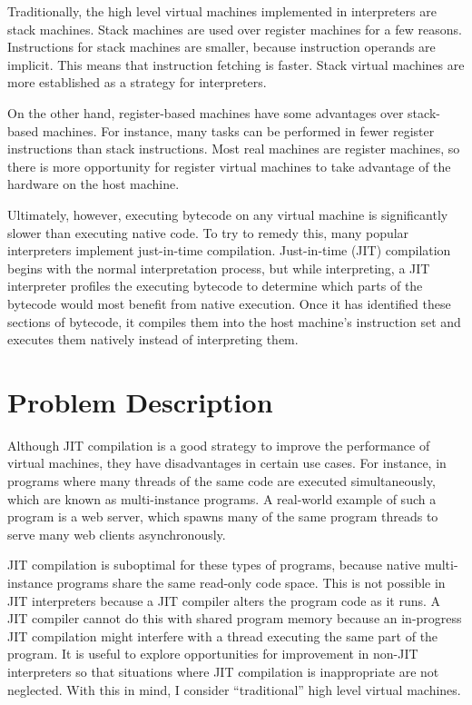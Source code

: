 		Traditionally, the high level virtual machines implemented in interpreters are stack machines. Stack machines are used over register machines for a few reasons. Instructions for stack machines are smaller, because instruction operands are implicit.  This means that instruction fetching is faster. Stack virtual machines are more established as a strategy for interpreters.
	
		On the other hand, register-based machines have some advantages over stack-based machines. For instance, many tasks can be performed in fewer register instructions than stack instructions. \citep{caseregistervm} Most real machines are register machines, so there is more opportunity for register virtual machines to take advantage of the hardware on the host machine. 
		
		Ultimately, however, executing bytecode on any virtual machine is significantly slower than executing native code.\citep{optimizingindirectbranch} To try to remedy this, many popular interpreters implement just-in-time compilation. Just-in-time (JIT) compilation begins with the normal interpretation process, but while interpreting, a JIT interpreter profiles the executing bytecode to determine which parts of the bytecode would most benefit from native execution. Once it has identified these sections of bytecode, it compiles them into the host machine's instruction set and executes them natively instead of interpreting them. 
		
	\section{Problem Description}
		Although JIT compilation is a good strategy to improve the performance of virtual machines, they have disadvantages in certain use cases. For instance, in programs where many threads of the same code are executed simultaneously, which are known as multi-instance programs. A real-world example of such a program is a web server, which spawns many of the same program threads to serve many web clients asynchronously.
		
		JIT compilation is suboptimal for these types of programs, because native multi-instance programs share the same read-only code space. This is not possible in JIT interpreters because a JIT compiler alters the program code as it runs. A JIT compiler cannot do this with shared program memory because an in-progress JIT compilation might interfere with a thread executing the same part of the program. It is useful to explore opportunities for improvement in non-JIT interpreters so that situations where JIT compilation is inappropriate are not neglected. With this in mind, I consider ``traditional'' high level virtual machines.
		
